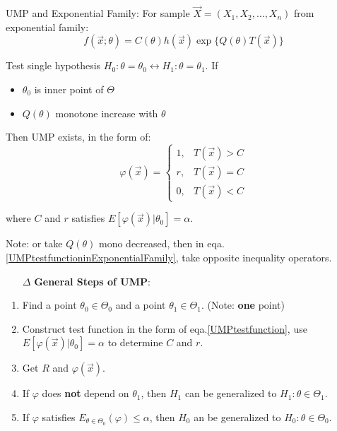 \documentclass[11pt,a4paper]{ctexart}
\numberwithin{equation}{section}%
\begin{document}
    UMP and Exponential Family: For sample $\vec{X}=(X_1,X_2,\dots,X_n)$ from exponential family:
    \[
    f(\vec{x};\theta)=C(\theta)h(\vec{x})\exp\{Q(\theta)T(\vec{x})\}    
    \]

    Test single hypothesis $H_0:\theta=\theta_0\longleftrightarrow H_1:\theta=\theta_1$.
    If 
    \begin{itemize}[topsep=0.5pt,itemsep=0pt]
        \item $\theta_0$ is inner point of $\Theta$
        \item $Q(\theta)$  monotone increase with $\theta$
    \end{itemize}

    Then UMP exists, in the form of:
    \begin{equation}\label{UMPtestfunctioninExponentialFamily}
            \varphi(\vec{x})=\begin{cases}
        1,&T(\vec{x})>C\\
        r,&T(\vec{x})=C\\
        0,&T(\vec{x})<C
    \end{cases} 
    \end{equation}
   
    

    where $C$ and $r$ satisfies $E[\varphi(\vec{x})|\theta_0]=\alpha$.

    Note: or take $Q(\theta)$ mono decreased, then in eqa.\ref{UMPtestfunctioninExponentialFamily}, take opposite inequality operators.
    
    \begin{itemize}
        \item [$\Delta$] \textbf{General Steps of UMP}:
    \end{itemize} 

    \begin{enumerate}
        \item Find a point $\theta_0\in\Theta_0$ and a point $\theta_1\in\Theta_1$. (Note: \textbf{one} point)
        \item Construct test function in the form of eqa.\hyperref[UMPtestfunction]{\ref{UMPtestfunction}}, use $E[\varphi(\vec{x})|\theta_0]=\alpha$ to determine $C$ and $r$.
        \item Get $R$ and $\varphi(\vec{x})$.
        \item If $\varphi$ does \textbf{not} depend on $\theta_1$, then $H_1$ can be generalized to $H_1:\theta\in\Theta_1$.
        \item If $\varphi$ satisfies $E_{\theta\in\Theta_0}(\varphi)\leq\alpha$, then $H_0$ an be generalized to $H_0:\theta\in\Theta_0$.
    \end{enumerate}
\end{document}

